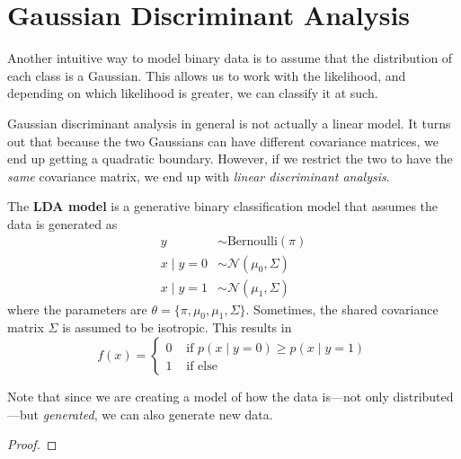 \section{Gaussian Discriminant Analysis} 

  Another intuitive way to model binary data is to assume that the distribution of each class is a Gaussian. This allows us to work with the likelihood, and depending on which likelihood is greater, we can classify it at such. 

  Gaussian discriminant analysis in general is not actually a linear model. It turns out that because the two Gaussians can have different covariance matrices, we end up getting a quadratic boundary. However, if we restrict the two to have the \textit{same} covariance matrix, we end up with \textit{linear discriminant analysis}. 

  \begin{definition}
    \label{def:linear-discriminant-analysis}
 
    The \textbf{LDA model} is a generative binary classification model that assumes the data is generated as 
    \begin{align} 
      y & \sim \text{Bernoulli}(\pi) \\
      x \mid y = 0 & \sim \mathcal{N} (\mu_0, \Sigma) \\
      x \mid y = 1 & \sim \mathcal{N} (\mu_1, \Sigma)
    \end{align}
    where the parameters are $\theta = \{\pi, \mu_0, \mu_1, \Sigma\}$. Sometimes, the shared covariance matrix $\Sigma$ is assumed to be isotropic. This results in 
    \begin{equation}
      f(x) = \begin{cases} 
        0 & \text{ if } p(x \mid y = 0) \geq p(x \mid y = 1) \\  
        1 & \text{ if else}
      \end{cases}
    \end{equation}
  \end{definition} 

  Note that since we are creating a model of how the data is---not only distributed---but \textit{generated}, we can also generate new data.  

  \begin{theorem}
    \label{thm:decision-boundary-is-linear-2}
    
  \end{theorem}
  \begin{proof}
    
  \end{proof}


